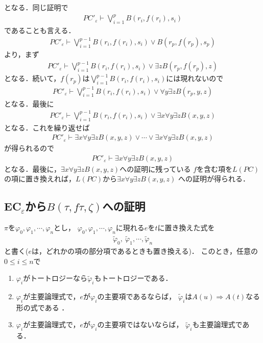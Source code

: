 	となる．同じ証明で
	\begin{align}
		{PC'}_{\varepsilon} \vdash \bigvee_{i=1}^{p} B(r_{i},f(r_{i}),s_{i})
	\end{align}
	であることも言える．
	\begin{align}
		{PC'}_{\varepsilon} \vdash \bigvee_{i=1}^{p-1} B(r_{i},f(r_{i}),s_{i})
		\vee B(r_{p},f(r_{p}),s_{p})
	\end{align}
	より，まず
	\begin{align}
		{PC'}_{\varepsilon} \vdash \bigvee_{i=1}^{p-1} B(r_{i},f(r_{i}),s_{i})
		\vee \exists z B(r_{p},f(r_{p}),z)
	\end{align}
	となる．続いて，$f(r_{p})$は$\bigvee_{i=1}^{p-1} B(r_{i},f(r_{i}),s_{i})$には現れないので
	\begin{align}
		{PC'}_{\varepsilon} \vdash \bigvee_{i=1}^{p-1} B(r_{i},f(r_{i}),s_{i})
		\vee \forall y \exists z B(r_{p},y,z)
	\end{align}
	となる．最後に
	\begin{align}
		{PC'}_{\varepsilon} \vdash \bigvee_{i=1}^{p-1} B(r_{i},f(r_{i}),s_{i})
		\vee \exists x \forall y \exists z B(x,y,z)
	\end{align}
	となる．これを繰り返せば
	\begin{align}
		{PC'}_{\varepsilon} \vdash \exists x \forall y \exists z B(x,y,z)
		\vee \cdots \vee \exists x \forall y \exists z B(x,y,z)
	\end{align}
	が得られるので
	\begin{align}
		{PC'}_{\varepsilon} \vdash \exists x \forall y \exists z B(x,y,z)
	\end{align}
	となる．最後に，$\exists x \forall y \exists z B(x,y,z)$への証明に残っている
	$f$を含む項を$L(PC)$の項に置き換えれば，$L(PC)$から$\exists x \forall y \exists z B(x,y,z)$
	への証明が得られる．
	
\subsection{{\bf EC}${}_{\varepsilon}$から$B(\tau,f\tau,\zeta)$への証明}
	$\pi$を$\varphi_{0},\varphi_{1},\cdots,\varphi_{n}$とし，
	$\varphi_{0},\varphi_{1},\cdots,\varphi_{n}$に現れる$e$を$t$に置き換えた式を
	\begin{align}
		\tilde{\varphi}_{0},\ \tilde{\varphi}_{1},\cdots, \tilde{\varphi}_{n}
	\end{align}
	と書く($e$は，どれかの項の部分項であるときも置き換える)．
	このとき，任意の$0 \leq i \leq n$で
	\begin{enumerate}
		\item $\varphi_{i}$がトートロジーなら$\tilde{\varphi}_{i}$もトートロジーである．
		\item $\varphi_{i}$が主要論理式で，$e$が$\varphi_{i}$の主要項であるならば，
			$\tilde{\varphi}_{i}$は$A(u) \Longrightarrow A(t)$なる形の式である
			\footnotemark．
		\item $\varphi_{i}$が主要論理式で，$e$が$\varphi_{i}$の主要項ではないならば，
			$\tilde{\varphi}_{i}$も主要論理式である．
	\end{enumerate}
	
